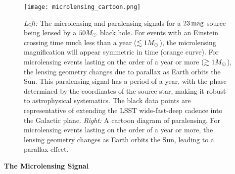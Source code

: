 \begin{figure}
\centering
\texttt{[image: microlensing\_cartoon.png]}
\vspace{1em}
\caption{\label{fig:microlensing_cartoon}
    \emph{Left:} 
        The microlensing and paralensing signals for a $23 \mathrm{\,mag}$ source being lensed by a $50 M_\odot$ black hole. 
        For events with an Einstein crossing time much less than a year ($\lesssim 1 M_\odot$), the microlensing magnification will appear symmetric in time (orange curve).
        For microlensing events lasting on the order of a year or more ($\gtrsim 1 M_\odot$), the lensing geometry changes due to parallax as Earth orbits the Sun.
        This paralensing signal has a period of a year, with the phase determined by the coordinates of the source star, making it robust to astrophysical systematics.
        The black data points are representative of extending the LSST wide-fast-deep cadence into the Galactic plane. 
        \emph{Right:} 
        A cartoon diagram of paralensing. 
        For microlensing events lasting on the order of a year or more, the lensing geometry changes as Earth orbits the Sun, leading to a parallax effect.
    }
\end{figure}

\noindent \textbf{The Microlensing Signal}

